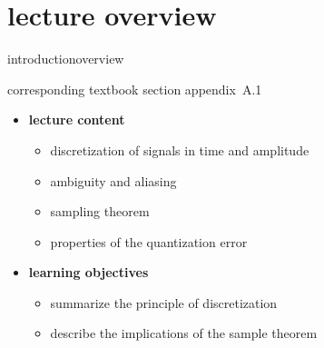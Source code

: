 


\subtitle{module A.1: fundamentals~---~digitization}


	

    \section[overview]{lecture overview}
        \begin{frame}{introduction}{overview}
            \begin{block}{corresponding textbook section}
                    appendix~A.1
            \end{block}

            \begin{itemize}
                \item   \textbf{lecture content}
                    \begin{itemize}
                        \item   discretization of signals in time and amplitude
                        \item   ambiguity and aliasing
                        \item   sampling theorem
                        \item   properties of the quantization error
                    \end{itemize}
                \bigskip
                \item<2->   \textbf{learning objectives}
                    \begin{itemize}
                        \item   summarize the principle of discretization
                        \item   describe the implications of the sample theorem
                    \end{itemize}
            \end{itemize}
        \end{frame}
        
